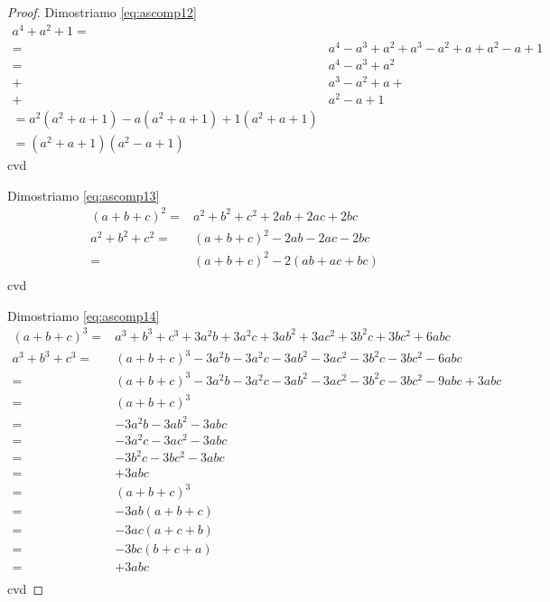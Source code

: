 \begin{proof}
Dimostriamo \ref{eq:ascomp12}
\begin{align*}
a^4+a^2+1=&\\
=&a^4-a^3+a^2+a^3-a^2+a+a^2-a+1\\
=&a^4-a^3+a^2\\
+&a^3-a^2+a+\\
+&a^2-a+1\\
=a^2(a^2+a+1)-a(a^2+a+1)+1(a^2+a+1)\\
=(a^2+a+1)(a^2-a+1)
\end{align*}
cvd

Dimostriamo \ref{eq:ascomp13}
\begin{align*}
(a+b+c)^2=&a^2+b^2+c^2+2ab+2ac+2bc\\
a^2+b^2+c^2=&(a+b+c)^2-2ab-2ac-2bc\\
=&(a+b+c)^2-2(ab+ac+bc)\\
\end{align*}
cvd

Dimostriamo \ref{eq:ascomp14}
\begin{align*}
	(a+b+c)^3=&a^3+b^3+c^3+3a^2b+3a^2c+3ab^2+3ac^2+3b^2c+3bc^2+6abc\\
	a^3+b^3+c^3=&(a+b+c)^3-3a^2b-3a^2c-3ab^2-3ac^2-3b^2c-3bc^2-6abc\\
=&(a+b+c)^3-3a^2b-3a^2c-3ab^2-3ac^2-3b^2c-3bc^2-9abc+3abc\\
=&(a+b+c)^3\\
=&-3a^2b-3ab^2-3abc\\
=&-3a^2c-3ac^2-3abc\\
=&-3b^2c-3bc^2-3abc\\
=&+3abc\\
=&(a+b+c)^3\\
=&-3ab(a+b+c)\\
=&-3ac(a+c+b)\\
=&-3bc(b+c+a)\\
=&+3abc\\
\end{align*}
cvd
\end{proof}